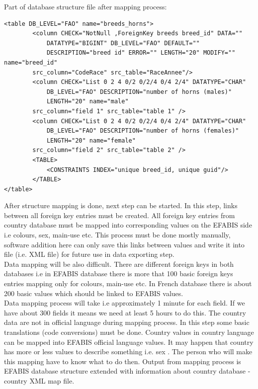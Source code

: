 Part of database structure file after mapping process:\\
\scriptsize {
\begin{verbatim}
<table DB_LEVEL="FAO" name="breeds_horns">
        <column CHECK="NotNull ,ForeignKey breeds breed_id" DATA=""
            DATATYPE="BIGINT" DB_LEVEL="FAO" DEFAULT=""
            DESCRIPTION="breed id" ERROR="" LENGTH="20" MODIFY="" name="breed_id" 
	    src_column="CodeRace" src_table="RaceAnnee"/>
        <column CHECK="List 0 2 4 0/2 0/2/4 0/4 2/4" DATATYPE="CHAR"
            DB_LEVEL="FAO" DESCRIPTION="number of horns (males)"
            LENGTH="20" name="male"
	    src_column="field 1" src_table="table 1" />
        <column CHECK="List 0 2 4 0/2 0/2/4 0/4 2/4" DATATYPE="CHAR"
            DB_LEVEL="FAO" DESCRIPTION="number of horns (females)"
            LENGTH="20" name="female"
	    src_column="field 2" src_table="table 2" />
        <TABLE>
            <CONSTRAINTS INDEX="unique breed_id, unique guid"/>
        </TABLE>
</table>

\end{verbatim}}
\normalsize
After structure mapping is done, next step can be started. In this step, links between all foreign key entries must be created. All foreign key entries from country database must be mapped into corresponding values on the EFABIS side i.e colours, sex, main-use etc. This process must be done mostly manually, software addition here can only save this links between values and write it into file (i.e. XML file) for future use in data exporting step.\\
 Data mapping will be also difficult. There are different foreign keys in both databases i.e in EFABIS database there is more that 100 basic foreign keys entries mapping only for colours, main-use etc. In French database there is about 200 basic values which should be linked to EFABIS values.\\
Data mapping process will take i.e approximately 1 minute for each field. If we have about 300 fields it means we need at least 5 hours to do this.
The country data are not in official language during mapping process. In this step some basic translations (code conversions) must be done. Country values in country language can be mapped into EFABIS official language values. It may happen that country has more or less values to describe something i.e. sex . The person who will make this mapping have to know what to do then.
Output from mapping process is EFABIS database structure extended with information about country database - country XML map file. \\
